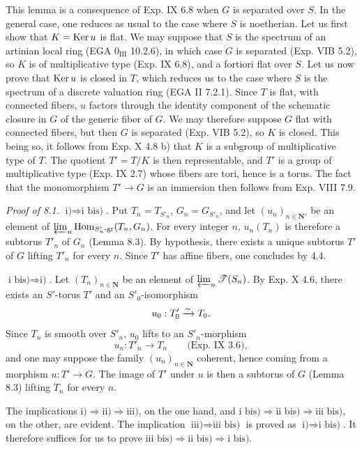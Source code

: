 This lemma is a consequence of Exp. IX 6.8 when $G$ is separated over $S$. In the general case, one reduces as usual to the case where $S$ is noetherian. Let us first show that $K=\operatorname{Ker} u$ is flat. We may suppose that $S$ is the spectrum of an artinian local ring (EGA $0_{\mathrm{III}}$ 10.2.6), in which case $G$ is separated (Exp. VIB 5.2), so $K$ is of multiplicative type (Exp. IX 6.8), and a fortiori flat over $S$. Let us now prove that $\operatorname{Ker} u$ is closed in $T$, which reduces us to the case where $S$ is the spectrum of a discrete valuation ring (EGA II 7.2.1). Since $T$ is flat, with connected fibers, $u$ factors through the identity component of the schematic closure in $G$ of the generic fiber of $G$. We may therefore suppose $G$ flat with connected fibers, but then $G$ is separated (Exp. VIB 5.2), so $K$ is closed. This being so, it follows from Exp. X 4.8 b) that $K$ is a subgroup of multiplicative type of $T$. The quotient $T'=T/K$ is then representable, and $T'$ is a group of multiplicative type (Exp. IX 2.7) whose fibers are tori, hence is a torus. The fact that the monomorphism $T'\to G$ is an immersion then follows from Exp. VIII 7.9.

\par\noindent\emph{Proof of 8.1.}
$\text{i)}\Rightarrow\text{i bis)}$. Put $T_n=T_{S'_n}$, $G_n=G_{S'_n}$, and let $(u_n)_{n\in\mathbf N'}$ be an element of $\varprojlim_n\operatorname{Hom}_{S'_n\text{-gr}}(T_n,G_n)$. For every integer $n$, $u_n(T_n)$ is therefore a subtorus $T'_n$ of $G_n$ (Lemma 8.3). By hypothesis, there exists a unique subtorus $T'$ of $G$ lifting $T'_n$ for every $n$. Since $T'$ has affine fibers, one concludes by 4.4.

$\text{i bis)}\Rightarrow\text{i)}$. Let $(T_n)_{n\in\mathbf N}$ be an element of $\varprojlim_n\mathscr T(S_n)$. By Exp. X 4.6, there exists an $S'$-torus $T'$ and an $S'_0$-isomorphism
\[
u_0:T'_0\xrightarrow{\sim} T_0.
\]
Since $T_n$ is smooth over $S'_n$, $u_0$ lifts to an $S'_n$-morphism
\[
u_n:T'_n\longrightarrow T_n\qquad\text{(Exp. IX 3.6)},
\]
and one may suppose the family $(u_n)_{n\in\mathbf N}$ coherent, hence coming from a morphism $u:T'\to G$. The image of $T'$ under $u$ is then a subtorus of $G$ (Lemma 8.3) lifting $T_n$ for every $n$.

The implications $\text{i)}\Rightarrow\text{ii)}\Rightarrow\text{iii)}$, on the one hand, and $\text{i bis)}\Rightarrow\text{ii bis)}\Rightarrow\text{iii bis)}$, on the other, are evident. The implication $\text{iii)}\Rightarrow\text{iii bis)}$ is proved as $\text{i)}\Rightarrow\text{i bis)}$. It therefore suffices for us to prove $\text{iii bis)}\Rightarrow\text{ii bis)}\Rightarrow\text{i bis)}$.


